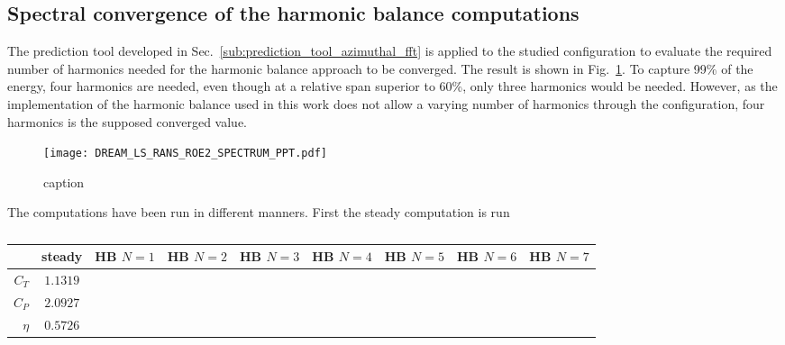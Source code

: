 
\subsection{Spectral convergence of the harmonic balance computations} 
\label{sub:dream_ls_hb_convergence}

The prediction tool developed in 
Sec.~\ref{sub:prediction_tool_azimuthal_fft} is applied
to the studied configuration to evaluate the
required number of harmonics needed for the
harmonic balance approach to be converged.
The result is shown in Fig.~\ref{fig:DREAM_LS_RANS_ROE2_SPECTRUM_PPT}.
To capture 99\% of the energy, four harmonics are needed, even though
at a relative span superior to 60\%, only three harmonics would be needed.
However, as the implementation of the harmonic balance used
in this work does not allow a varying number of harmonics through the
configuration, four harmonics is the supposed converged value.
\begin{figure}[htbp]
  \centering
  \texttt{[image: DREAM\_LS\_RANS\_ROE2\_SPECTRUM\_PPT.pdf]}
  \caption{caption}
  \label{fig:DREAM_LS_RANS_ROE2_SPECTRUM_PPT}
\end{figure}

The computations have been run in different manners. First the steady computation
is run
\begin{table}[htb]
   \centering
  \begin{tabular}{rcccccccc}
    \toprule
    & steady & HB $N=1$ & HB $N=2$ & HB $N=3$ & HB $N=4$ & HB $N=5$ & HB $N=6$ & HB $N=7$\\
    \midrule
    $C_T$  & $1.1319$ &  \\
    $C_P$  & $2.0927$ &  \\
    $\eta$ & $0.5726$ &  \\
    \bottomrule
  \end{tabular}
  \caption{}
  \label{tab:}
\end{table}



